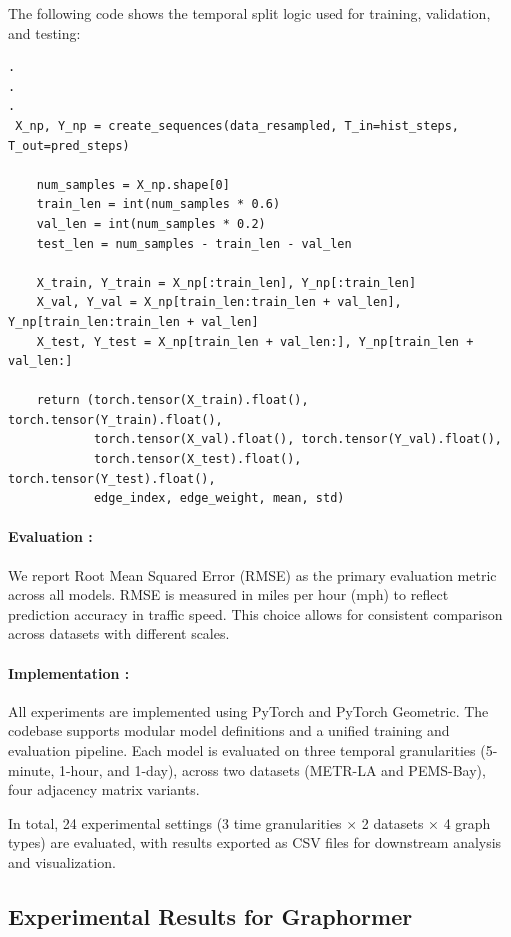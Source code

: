 \documentclass[runningheads]{llncs}
\begin{document}
The following code shows the temporal split logic used for training, validation, and testing:

\begin{lstlisting}[style=customPython]
.
.
.
 X_np, Y_np = create_sequences(data_resampled, T_in=hist_steps, T_out=pred_steps)

    num_samples = X_np.shape[0]
    train_len = int(num_samples * 0.6)
    val_len = int(num_samples * 0.2)
    test_len = num_samples - train_len - val_len

    X_train, Y_train = X_np[:train_len], Y_np[:train_len]
    X_val, Y_val = X_np[train_len:train_len + val_len], Y_np[train_len:train_len + val_len]
    X_test, Y_test = X_np[train_len + val_len:], Y_np[train_len + val_len:]

    return (torch.tensor(X_train).float(), torch.tensor(Y_train).float(),
            torch.tensor(X_val).float(), torch.tensor(Y_val).float(),
            torch.tensor(X_test).float(), torch.tensor(Y_test).float(),
            edge_index, edge_weight, mean, std)
\end{lstlisting}

\paragraph{Evaluation : }
We report Root Mean Squared Error (RMSE) as the primary evaluation metric across all models. RMSE is measured in miles per hour (mph) to reflect prediction accuracy in traffic speed. This choice allows for consistent comparison across datasets with different scales.

\paragraph{Implementation : }
All experiments are implemented using PyTorch and PyTorch Geometric. The codebase supports modular model definitions and a unified training and evaluation pipeline. Each model is evaluated on three temporal granularities (5-minute, 1-hour, and 1-day), across two datasets (METR-LA and PEMS-Bay), four adjacency matrix variants.

In total, 24 experimental settings (3 time granularities × 2 datasets × 4 graph types) are evaluated, with results exported as CSV files for downstream analysis and visualization.

\subsection{Experimental Results for Graphormer}
\end{document}
